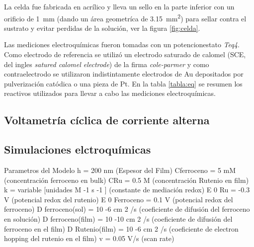 	 		La celda fue fabricada en acrílico y lleva un sello en la parte inferior con un orificio de \SI{1}{\mm} (dando un área geometríca de \SI{3.15}{\mm^{2}}) para sellar contra el sustrato y evitar perdidas de la solución, ver la figura \ref{fig:celda}. 
	
			 Las mediciones electroquímicas fueron tomadas con un potencionestato \textit{Teq4}. Como electrodo de referencia se utilizó un electrodo saturado de calomel (SCE, del ingles \textit{satured calomel electrode}) de la firma \textit{cole-parmer} y como contraelectrodo se utilizaron indistintamente electrodos de Au depositados por pulverización catódica o una pieza de Pt. En la tabla \ref{tabla:eq} se resumen los reactivos utilizados para llevar a cabo las mediciones electroquímicas. 

	 \subsection{Voltametría cíclica de corriente alterna}

	 \subsection{Simulaciones elctroquímicas}\label{simulacion}

	 	Parametros del Modelo
		h = 200 nm (Espesor del Film)
		Cferroceno = 5 mM (concentración ferroceno en bulk)
		CRu = 0.5 M (concentración Rutenio en film)
		k = variable [unidades M -1 s -1 ] (constante de mediación redox)
		E 0 Ru = -0.3 V (potencial redox del rutenio)
		E 0 Ferroceno = 0.1 V (potencial redox del ferroceno)
		D ferroceno(sol) = 10 -6 cm 2 /s (coeficiente de difusión del ferroceno en solución)
		D ferroceno(film) = 10 -10 cm 2 /s (coeficiente de difusión del ferroceno en el film)
		D Rutenio(film) = 10 -6 cm 2 /s (coeficiente de electron hopping del rutenio en el film)
		v = 0.05 V/s (scan rate)
	
